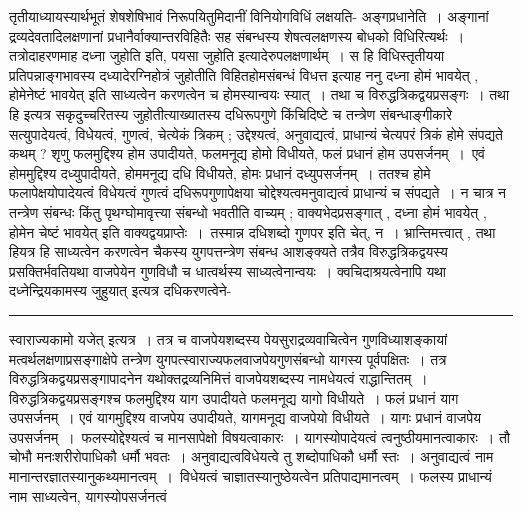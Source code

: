 \documentclass[11pt, openany]{book}
\makeatletter
\def\blfootnote{\gdef\@thefnmark{}\@footnotetext}
\makeatother
\begin{document}
 तृतीयाध्यायस्यार्थभूतं शेषशेषिभावं निरूपयितुमिदानीं विनियोगविधिं लक्षयति- {\br अङ्गप्रधानेति~।} अङ्गानां द्रव्यदेवतादिलक्षणानां प्रधानैर्वाक्यान्तरविहितैः सह संबन्धस्य शेषत्वलक्षणस्य बोधको विधिरित्यर्थः~। तत्रोदाहरणमाह  {\qt दध्ना जुहोति} इति, {\qt पयसा जुहोति} इत्यादेरुपलक्षणार्थम्~। स हि विधिस्तृतीयया प्रतिपन्नाङ्गभावस्य दध्यादेरग्निहोत्रं जुहोतीति विहितहोमसंबन्धं विधत्त इत्याह  {\br ननु} {\qt दध्ना होमं भावयेत् , होमेनेष्टं भावयेत्} इति साध्यत्वेन करणत्वेन च होमस्यान्वयः स्यात्~। तथा च विरुद्धत्रिकद्वयप्रसङ्गः~। तथा हि इत्यत्र सकृदुच्चरितस्य
जुहोतीत्याख्यातस्य दधिरूपगुणे किंचिदिष्टे च तन्त्रेण संबन्धाङ्गीकारे सत्युपादेयत्वं, विधेयत्वं, गुणत्वं, चेत्येकं त्रिकम् ; उद्देश्यत्वं, अनुवाद्यत्वं, प्राधान्यं चेत्यपरं त्रिकं होमे संपद्यते कथम् ? शृणु {\qt फलमुद्दिश्य होम उपादीयते, फलमनूद्य होमो विधीयते, फलं प्रधानं होम उपसर्जनम्~}।~एवं होममुद्दिश्य दध्युपादीयते, होममनूद्य दधि विधीयते, होमः
प्रधानं दध्युपसर्जनम्~। ततश्च होमे फलापेक्षयोपादेयत्वं विधेयत्वं गुणत्वं दधिरूपगुणापेक्षया चोद्देश्यत्वमनुवाद्यत्वं प्राधान्यं च संपद्यते~। न चात्र न तन्त्रेण संबन्धः किंतु पृथग्घोमावृत्त्या संबन्धो भवतीति वाच्यम् ; वाक्यभेदप्रसङ्गात् , {\qt दध्ना होमं भावयेत् , होमेन चेष्टं भावयेत्} इति वाक्यद्वयप्राप्तेः~।~तस्मान्न {\qt दधि}शब्दो गुणपर इति चेत्, न~। भ्रान्तिमत्त्वात् , तथा हि\textendash यत्र हि साध्यत्वेन करणत्वेन चैकस्य युगपत्तन्त्रेण संबन्ध आशङ्क्यते तत्रैव विरुद्धत्रिकद्वयस्य प्रसक्तिर्भवति\textendash यथा {\qt वाजपेयेन}
\newpage
\fancyhead[RE]{[विनियोग\textemdash\ }
{\bl\noindent गुणविधौ च धात्वर्थस्य \blfootnote{पाठा०\textemdash\ $^{१}$साध्यत्वेनैव टीका.}\footnotemark साध्यत्वेनान्वयः~। क्वचिदाश्रयत्वेनापि यथा
{\qtl दध्नेन्द्रियकामस्य जुहुयात्} इत्यत्र दधिकरणत्वेने- }\\
\hrule
\vspace{3mm}
\noindent
{\qt स्वाराज्यकामो यजेत्} इत्यत्र~। तत्र च वाजपेयशब्दस्य पेयसुराद्रव्यवाचित्वेन गुणविध्याशङ्कायां मत्वर्थलक्षणाप्रसङ्गाक्षेपे तन्त्रेण युगपत्स्वाराज्यफलवाजपेयगुणसंबन्धो यागस्य पूर्वपक्षितः~। तत्र विरुद्धत्रिकद्वयप्रसङ्गापादनेन यथोक्तद्रव्यनिमित्तं वाजपेयशब्दस्य नामधेयत्वं राद्धान्तितम्~। विरुद्धत्रिकद्वयप्रसङ्गश्च फलमुद्दिश्य याग उपादीयते फलमनूद्य यागो विधीयते~। फलं प्रधानं याग उपसर्जनम्~। एवं यागमुद्दिश्य वाजपेय उपादीयते, यागमनूद्य वाजपेयो विधीयते~। यागः प्रधानं वाजपेय उपसर्जनम्~।~फलस्योद्देश्यत्वं च मानसापेक्षो विषयत्वाकारः~। यागस्योपादेयत्वं त्वनुष्ठीयमानत्वाकारः~। तौ चोभौ मनःशरीरोपाधिकौ धर्मौ भवतः~। अनुवाद्यत्वविधेयत्वे तु शब्दोपाधिकौ धर्मौ स्तः~। अनुवाद्यत्वं नाम मानान्तरज्ञातस्यानुकथ्यमानत्वम्~।~विधेयत्वं चाज्ञातस्यानुष्ठेयत्वेन प्रतिपाद्यमानत्वम्~। फलस्य प्राधान्यं नाम साध्यत्वेन, यागस्योपसर्जनत्वं
\end{document}
